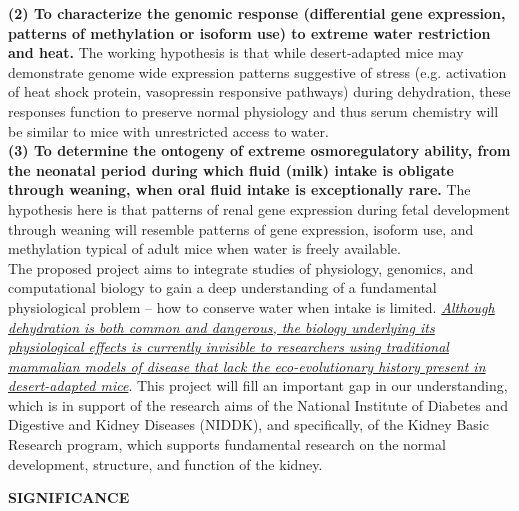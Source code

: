 \documentclass[11pt]{article}
\begin{document}
\noindent \textbf{(2) To characterize the genomic response (differential gene expression, patterns of methylation or isoform use) to extreme water restriction and heat.} The working hypothesis is that while desert-adapted mice may demonstrate genome wide expression patterns suggestive of stress (e.g. activation of heat shock protein, vasopressin responsive pathways) during dehydration, these responses function to preserve normal physiology and thus serum chemistry will be similar to mice with unrestricted access to water. \\

\noindent \textbf{(3) To determine the ontogeny of extreme osmoregulatory ability, from the neonatal period during which fluid (milk) intake is obligate through weaning, when oral fluid intake is exceptionally rare. } The hypothesis here is that patterns of renal gene expression during fetal development through weaning will resemble patterns of gene expression, isoform use, and methylation typical of adult mice when water is freely available. \\


\noindent The proposed project aims to integrate studies of physiology, genomics, and computational biology to gain a deep understanding of a fundamental physiological problem – how to conserve water when intake is limited. \ul{\emph{Although dehydration is both common and dangerous, the biology underlying its physiological effects is currently invisible to researchers using traditional mammalian models of disease that lack the eco-evolutionary history present in desert-adapted mice}}. This project will fill an important gap in our understanding, which is in support of the research aims of the National Institute of Diabetes and Digestive and Kidney Diseases (NIDDK), and specifically, of the Kidney Basic Research program, which supports fundamental research on the normal development, structure, and function of the kidney.


\newpage

\noindent \textbf{SIGNIFICANCE} \\
\end{document}
